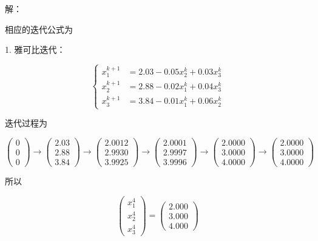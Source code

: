 \documentclass{article}
\begin{document}
\noindent 解：

相应的迭代公式为

1. 雅可比迭代：

$$
\left\{
\begin{aligned}
    x_1^{k + 1} &= 2.03 - 0.05x_2^k + 0.03x_3^k \\
    x_2^{k + 1} &= 2.88 - 0.02x_1^k + 0.04x_3^k \\
    x_3^{k + 1} &= 3.84 - 0.01x_1^k + 0.06x_2^k
\end{aligned}
\right.
$$

迭代过程为

$$
\begin{pmatrix}
    0 \\
    0 \\
    0
\end{pmatrix}
\longrightarrow
\begin{pmatrix}
    2.03 \\
    2.88 \\
    3.84
\end{pmatrix}
\longrightarrow
\begin{pmatrix}
    2.0012 \\
    2.9930 \\
    3.9925
\end{pmatrix}
\longrightarrow
\begin{pmatrix}
    2.0001 \\
    2.9997 \\
    3.9996
\end{pmatrix}
\longrightarrow
\begin{pmatrix}
    2.0000 \\
    3.0000 \\
    4.0000
\end{pmatrix}
\longrightarrow
\begin{pmatrix}
    2.0000 \\
    3.0000 \\
    4.0000
\end{pmatrix}
$$

所以

$$
\begin{pmatrix}
    x_1^4 \\
    x_2^4 \\
    x_3^4
\end{pmatrix}
=
\begin{pmatrix}
    2.000 \\
    3.000 \\
    4.000
\end{pmatrix}
$$
\end{document}
